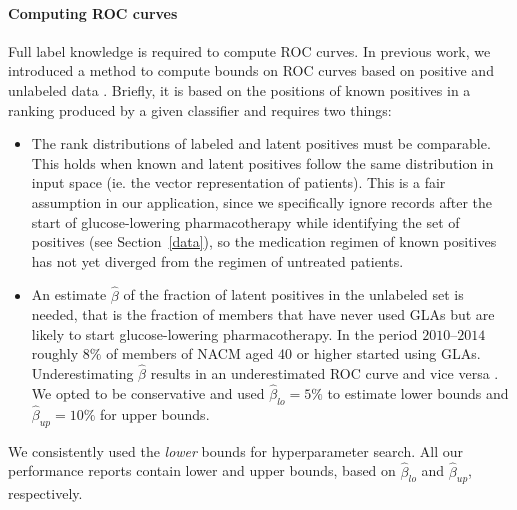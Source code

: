 \paragraph{Computing ROC curves} Full label knowledge is required to compute ROC curves. In previous work, we introduced a method to compute bounds on ROC curves based on positive and unlabeled data \citep{claesen2015icml}. Briefly, it is based on the positions of known positives in a ranking produced by a given classifier and requires two things:
\begin{itemize}
\item The rank distributions of labeled and latent positives must be comparable. This holds when known and latent positives follow the same distribution in input space (ie. the vector representation of patients). This is a fair assumption in our application, since we specifically ignore records after the start of glucose-lowering pharmacotherapy while identifying the set of positives (see Section~\ref{data}), so the medication regimen of known positives has not yet diverged from the regimen of untreated patients.
\item An estimate $\hat{\beta}$ of the fraction of latent positives in the unlabeled set is needed, that is the fraction of members that have never used GLAs but are likely to start glucose-lowering pharmacotherapy. In the period $2010$--$2014$ roughly $8\%$ of members of NACM aged 40 or higher started using GLAs. Underestimating $\hat{\beta}$ results in an underestimated ROC curve and vice versa  \citep{claesen2015icml}. We opted to be conservative and used $\hat{\beta}_{lo} = 5\%$ to estimate lower bounds and $\hat{\beta}_{up}=10\%$ for upper bounds.
\end{itemize} 
We consistently used the \emph{lower} bounds for hyperparameter search. All our performance reports contain lower and upper bounds, based on $\hat{\beta}_{lo}$ and $\hat{\beta}_{up}$, respectively.

